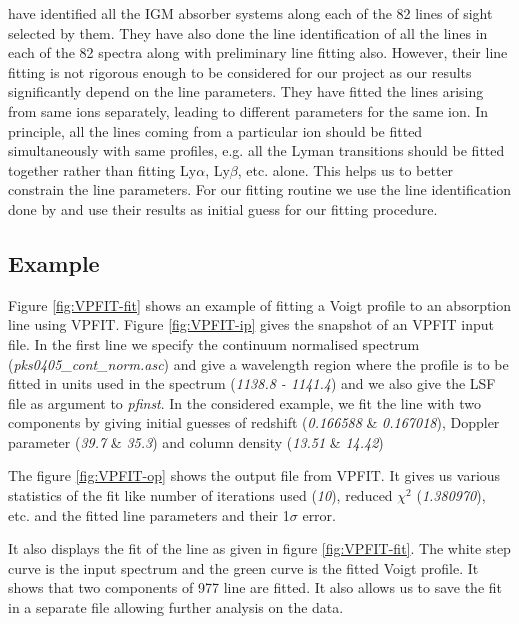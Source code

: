 \citet{danforth-2016} have identified all the IGM absorber systems along each of the 82 lines of sight selected by them. They have also done the line identification of all the lines in each of the 82 spectra along with preliminary line fitting also. However, their line fitting is not rigorous enough to be considered for our project as our results significantly depend on the line parameters. They have fitted the lines arising from same ions separately, leading to different parameters for the same ion. In principle, all the lines coming from a particular ion should be fitted simultaneously with same profiles, e.g. all the Lyman transitions should be fitted together rather than fitting Ly$\alpha$, Ly$\beta$, etc. alone. This helps us to better constrain the line parameters. For our fitting routine we use the line identification done by \citet{danforth-2016} and use their results as initial guess for our fitting procedure.

\vfill

\subsection{Example}  \label{sec:VPfit-example}

Figure \ref{fig:VPFIT-fit} shows an example of fitting a Voigt profile to an absorption line using VPFIT. Figure \ref{fig:VPFIT-ip} gives the snapshot of an VPFIT input file. In the first line we specify the continuum normalised spectrum (\emph{pks0405\_cont\_norm.asc}) and give a wavelength region where the profile is to be fitted in units used in the spectrum (\emph{1138.8 - 1141.4}) and we also give the LSF file as argument to \emph{pfinst}. In the considered example, we fit the line with two  components by giving initial guesses of redshift (\emph{0.166588} \& \emph{0.167018}), Doppler parameter (\emph{39.7} \& \emph{35.3}) and column density (\emph{13.51} \& \emph{14.42})
 
The figure \ref{fig:VPFIT-op} shows the output file from VPFIT. It gives us various statistics of the fit like number of iterations used (\emph{10}), reduced $\chi^2$ (\emph{1.380970}), etc. and the fitted line parameters and their 1$\sigma$ error.

It also displays the fit of the line as given in figure \ref{fig:VPFIT-fit}. The white step curve is the input spectrum and the green curve is the fitted Voigt profile. It shows that two components of  977 line are fitted. It also allows us to save the fit in a separate file allowing further analysis on the data.


